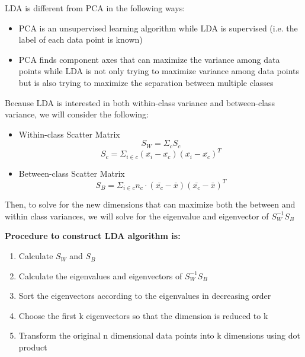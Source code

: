 \documentclass[12pt]{article}
\begin{document}
LDA is different from PCA in the following ways:
\begin{itemize}
	\item PCA is an unsupervised learning algorithm while LDA is supervised (i.e. the label of each data point is known)
	\item PCA finds component axes that can maximize the variance among data points while LDA is not only trying to maximize variance among data points but is also trying to maximize the separation between multiple classes
\end{itemize}

Because LDA is interested in both within-class variance and between-class variance, we will consider the following:
\begin{itemize}
	\item Within-class Scatter Matrix
$$S_W = \Sigma_c S_c$$
$$S_c = \Sigma_{i \in c}(\bar{x_i} - \bar{x_c})(\bar{x_i} - \bar{x_c})^T$$
	\item Between-class Scatter Matrix
$$S_B = \Sigma_{i \in c}n_c\cdot (\bar{x_c} - \bar{x})(\bar{x_c} - \bar{x})^T$$
\end{itemize}

Then, to solve for the new dimensions that can maximize both the between and within class variances, we will solve for the eigenvalue and eigenvector of $S_W^{-1}S_B$

\textbf{Procedure to construct LDA algorithm is:}
\begin{enumerate}
	\item Calculate $S_W$ and $S_B$
	\item Calculate the eigenvalues and eigenvectors of $S_W^{-1}S_B$
	\item Sort the eigenvectors according to the eigenvalues in decreasing order
	\item Choose the first k eigenvectors so that the dimension is reduced to k
	\item Transform the original n dimensional data points into k dimensions using dot product
\end{enumerate}
\end{document}
